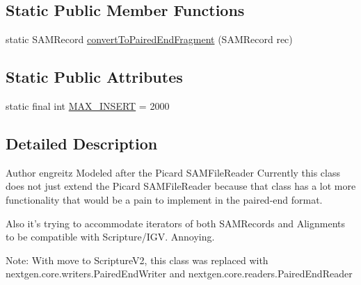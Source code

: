 \subsection*{Static Public Member Functions}
\begin{DoxyCompactItemize}
\item 
static S\+A\+M\+Record \hyperlink{classbroad_1_1pda_1_1samtools_1_1_s_a_m_paired_end_file_reader_ae86af5872ad93d8a8dcb34e3fa03510a}{convert\+To\+Paired\+End\+Fragment} (S\+A\+M\+Record rec)
\end{DoxyCompactItemize}
\subsection*{Static Public Attributes}
\begin{DoxyCompactItemize}
\item 
static final int \hyperlink{classbroad_1_1pda_1_1samtools_1_1_s_a_m_paired_end_file_reader_abd20642531b0de318293361369dc068c}{M\+A\+X\+\_\+\+I\+N\+S\+E\+R\+T} = 2000
\end{DoxyCompactItemize}


\subsection{Detailed Description}
\begin{DoxyAuthor}{Author}
engreitz Modeled after the Picard S\+A\+M\+File\+Reader Currently this class does not just extend the Picard S\+A\+M\+File\+Reader because that class has a lot more functionality that would be a pain to implement in the paired-\/end format.
\end{DoxyAuthor}
Also it's trying to accommodate iterators of both S\+A\+M\+Records and Alignments to be compatible with Scripture/\+I\+G\+V. Annoying.

Note\+: With move to Scripture\+V2, this class was replaced with nextgen.\+core.\+writers.\+Paired\+End\+Writer and nextgen.\+core.\+readers.\+Paired\+End\+Reader 


